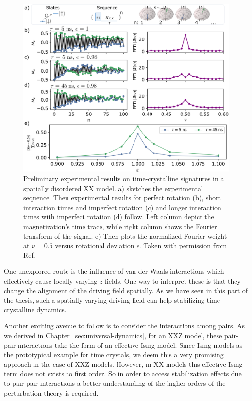 \begin{figure}[htb]
	\centering
	\includegraphics[width=\textwidth]{gfx/preliminary-timecrystal.png}
	\caption{Preliminary experimental results on time-crystalline signatures in a spatially disordered XX model. a) sketches the experimental sequence. Then experimental results for perfect rotation (b), short interaction times and imperfect rotation (c) and longer interaction times with imperfect rotation (d) follow. Left column depict the magnetization's time trace, while right column shows the Fourier transform of the signal. e) Then plots the normalized Fourier weight at $\nu=0.5$ versus rotational deviation $\epsilon$. Taken with permission from Ref.~\cite{geierShapingHamiltonianManybody}}
	\label{fig:rydberg-timecrystal-experiment}
\end{figure}

One unexplored route is the influence of van der Waals interactions which effectively cause locally varying $z$-fields. One way to interpret these is that they change the alignment of the driving field spatially. As we have seen in this part of the thesis, such a spatially varying driving field can help stabilizing time crystalline dynamics.

Another exciting avenue to follow is to consider the interactions among pairs. As we derived in Chapter~\ref{sec:universal-dynamics}, for an XXZ model, these pair-pair interactions take the form of an effective Ising model. Since Ising models as the prototypical example for time crystals, we deem this a very promising approach in the case of XXZ models. However, in XX models this effective Ising term does not exists to first order. So in order to access stabilization effects due to pair-pair interactions a better understanding of the higher orders of the perturbation theory is required.



